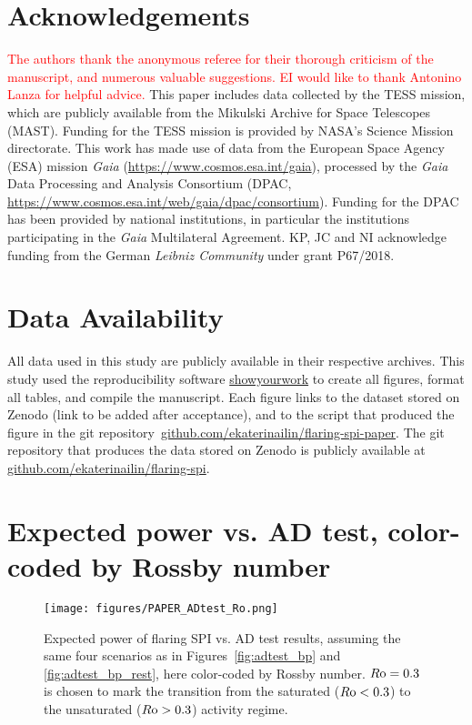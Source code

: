 \documentclass[twocolumn]{aastex631}
\begin{document}
\section*{Acknowledgements}
\textcolor{red}{The authors thank the anonymous referee for their thorough criticism of the manuscript, and numerous valuable suggestions. EI would like to thank Antonino Lanza for helpful advice.}
This paper includes data collected by the TESS mission, which are publicly available from the Mikulski Archive for Space Telescopes (MAST).
Funding for the TESS mission is provided by NASA’s Science Mission directorate. 
This work has made use of data from the European Space Agency (ESA) mission {\it Gaia} (\url{https://www.cosmos.esa.int/gaia}), processed by the {\it Gaia} Data Processing and Analysis Consortium (DPAC, \url{https://www.cosmos.esa.int/web/gaia/dpac/consortium}). Funding for the DPAC
has been provided by national institutions, in particular the institutions participating in the {\it Gaia} Multilateral Agreement.
KP, JC and NI acknowledge funding from the German \textit{Leibniz Community} under grant P67/2018.
\section*{Data Availability}
All data used in this study are publicly available in their respective archives.
This study used the reproducibility software \href{https://github.com/showyourwork/showyourwork}{showyourwork}
\citep{luger2021mappinga} to create all figures, format all tables, and compile the manuscript. Each figure links to the dataset stored on Zenodo (link to be added after acceptance), and to the script that produced the figure in the git repository~\href{https://github.com/ekaterinailin/flaring-spi-paper}{github.com/ekaterinailin/flaring-spi-paper}. The git repository that produces the data stored on Zenodo is publicly available at \href{https://github.com/ekaterinailin/flaring-spi}{github.com/ekaterinailin/flaring-spi}. 


\appendix


\section{Expected power vs. AD test, color-coded by Rossby number}
\begin{figure*}[ht!]
    \begin{centering}
        \texttt{[image: figures/PAPER\_ADtest\_Ro.png]}
        \caption{
        Expected power of flaring SPI vs. AD test results, assuming the same four scenarios as in Figures~\ref{fig:adtest_bp} and \ref{fig:adtest_bp_rest}, here color-coded by Rossby number. $R\rm o=0.3$ is chosen to mark the transition from the saturated ($R\rm o < 0.3$) to the unsaturated ($R\rm o > 0.3$) activity regime. 
        }
        \label{fig:adtest_ro}
    \end{centering}
\end{figure*}
\end{document}
